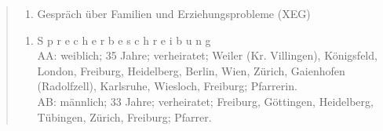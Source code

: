 \documentclass[
  letterpaper,
]{scrbook}
\providecommand{\tightlist}{%
  \setlength{\itemsep}{0pt}\setlength{\parskip}{0pt}}\usepackage{longtable,booktabs,array}
\begin{document}
\begin{quote}
\begin{enumerate}
\def\labelenumi{\arabic{enumi}.}
\tightlist
\item
  Gespräch über Familien und Erziehungsprobleme (XEG)
\end{enumerate}

\begin{enumerate}
\def\labelenumi{(\arabic{enumi})}
\tightlist
\item
  S p r e c h e r b e s c h r e i b u n g\\
  AA: weiblich; 35 Jahre; verheiratet; Weiler (Kr. Villingen),
  Königsfeld, London, Freiburg, Heidelberg, Berlin, Wien, Zürich,
  Gaienhofen (Radolfzell), Karlsruhe, Wiesloch, Freiburg; Pfarrerin.\\
  AB: männlich; 33 Jahre; verheiratet; Freiburg, Göttingen, Heidelberg,
  Tübingen, Zürich, Freiburg; Pfarrer.
\end{enumerate}
\end{quote}
\end{document}
